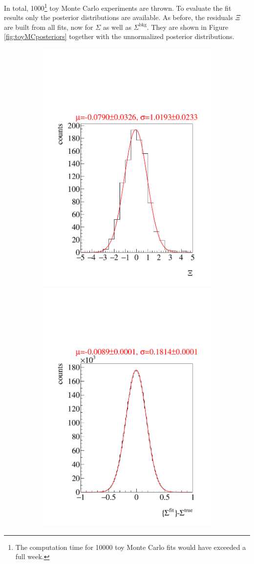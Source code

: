 In total, 1000\footnote{The computation time for 10000 toy Monte Carlo fits would have exceeded a full week.} toy Monte Carlo experiments are thrown. To evaluate the fit results only the posterior distributions are available. As before, the residuals $\Xi$ are built from all fits, now for $\Sigma$ as well as $\Sigma^\text{bkg}$. They are shown in Figure \ref{fig:toyMCposteriors} together with the unnormalized posterior distributions. 
\begin{figure}[htbp]
	\centering
	\begin{subfigure}{\linewidth}
		\includegraphics[width=.49\linewidth]{../bayes/event_based_fit/plots/combined_post_add.pdf}
		\includegraphics[width=.49\linewidth]{../bayes/event_based_fit/plots/combined_post_add_raw.pdf}
	\end{subfigure}

\end{figure}

